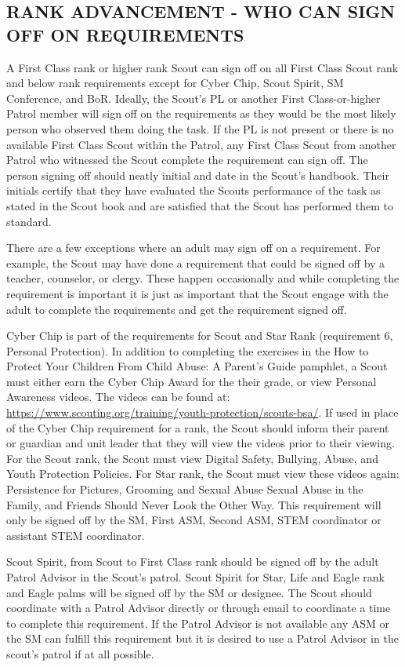 \documentclass{ltxguide}
\begin{document}
\subsection{RANK ADVANCEMENT - WHO CAN SIGN OFF ON REQUIREMENTS}
A First Class rank or higher rank Scout can sign off on all First Class Scout rank and below rank requirements except for Cyber Chip, Scout Spirit, \ac{SM} Conference, and \ac{BoR}. Ideally, the Scout's \ac{PL} or another First Class-or-higher Patrol member will sign off on the requirements as they would be the most likely person who observed them doing the task. If the \ac{PL} is not present or there is no available First Class Scout within the Patrol, any First Class Scout from another Patrol who witnessed the Scout complete the requirement can sign off. The person signing off should neatly initial and date in the Scout's handbook. Their initials certify that they have evaluated the Scouts performance of the task as stated in the Scout book and are satisfied that the Scout has performed them to standard.

There are a few exceptions where an adult may sign off on a requirement. For example, the Scout may have done a requirement that could be signed off by a teacher, counselor, or clergy. These happen occasionally and while completing the requirement is important it is just as important that the Scout engage with the adult to complete the requirements and get the requirement signed off.

Cyber Chip is part of the requirements for Scout and Star Rank (requirement 6, Personal Protection). In addition to completing the exercises in the How to Protect Your Children From Child Abuse: A Parent's Guide pamphlet, a Scout must either earn the Cyber Chip Award for the their grade, or view Personal Awareness videos.  The videos can be found at: \url{https://www.scouting.org/training/youth-protection/scouts-bsa/}. If used in place of the Cyber Chip requirement for a rank, the Scout should inform their parent or guardian and unit leader that they will view the videos prior to their viewing. For the Scout rank, the Scout must view Digital Safety, Bullying, Abuse, and Youth Protection Policies. For Star rank, the Scout must view these videos again: Persistence for Pictures, Grooming and Sexual Abuse Sexual Abuse in the Family, and Friends Should Never Look the Other Way. This requirement will only be signed off by the SM, First \ac{ASM}, Second \ac{ASM}, STEM coordinator or assistant STEM coordinator.

Scout Spirit, from Scout to First Class rank should be signed off by the adult Patrol Advisor in the Scout's patrol. Scout Spirit for Star, Life and Eagle rank and Eagle palms will be signed off by the \ac{SM} or designee. The Scout should coordinate with a Patrol Advisor directly or through email to coordinate a time to complete this requirement. If the Patrol Advisor is not available any \ac{ASM} or the \ac{SM} can fulfill this requirement but it is desired to use a Patrol Advisor in the scout's patrol if at all possible.
\end{document}
